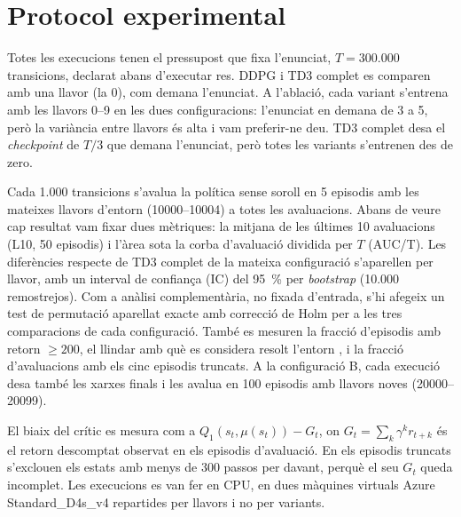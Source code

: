 \section{Protocol experimental}\label{sec:protocol}

Totes les execucions tenen el pressupost que fixa l'enunciat, $T = 300.000$ transicions, declarat abans d'executar res. DDPG i TD3 complet es comparen amb una llavor (la 0), com demana l'enunciat. A l'ablació, cada variant s'entrena amb les llavors 0--9 en les dues configuracions: l'enunciat en demana de 3 a 5, però la variància entre llavors és alta i vam preferir-ne deu. TD3 complet desa el \emph{checkpoint} de $T/3$ que demana l'enunciat, però totes les variants s'entrenen des de zero.

Cada 1.000 transicions s'avalua la política sense soroll en 5 episodis amb les mateixes llavors d'entorn (10000--10004) a totes les avaluacions. Abans de veure cap resultat vam fixar dues mètriques: la mitjana de les últimes 10 avaluacions (L10, 50 episodis) i l'àrea sota la corba d'avaluació dividida per $T$ (AUC/T). Les diferències respecte de TD3 complet de la mateixa configuració s'aparellen per llavor, amb un interval de confiança (IC) del 95~\% per \emph{bootstrap} (10.000 remostrejos). Com a anàlisi complementària, no fixada d'entrada, s'hi afegeix un test de permutació aparellat exacte amb correcció de Holm per a les tres comparacions de cada configuració. També es mesuren la fracció d'episodis amb retorn $\geq 200$, el llindar amb què es considera resolt l'entorn \parencite{gymnasium}, i la fracció d'avaluacions amb els cinc episodis truncats. A la configuració B, cada execució desa també les xarxes finals i les avalua en 100 episodis amb llavors noves (20000--20099).

El biaix del crític es mesura com a $Q_1(s_t,\mu(s_t)) - G_t$, on $G_t = \sum_k \gamma^k r_{t+k}$ és el retorn descomptat observat en els episodis d'avaluació. En els episodis truncats s'exclouen els estats amb menys de 300 passos per davant, perquè el seu $G_t$ queda incomplet. Les execucions es van fer en CPU, en dues màquines virtuals Azure Standard\_D4s\_v4 repartides per llavors i no per variants.
